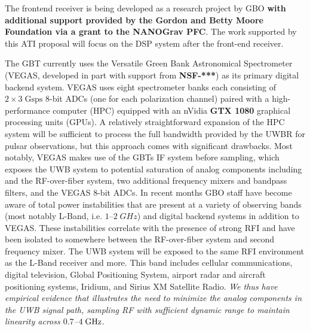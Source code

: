 \documentclass[10pt]{NSF}
\begin{document}
The frontend receiver is being developed as a research project by GBO
\textbf{with additional support provided by the Gordon and Betty Moore
  Foundation via a grant to the NANOGrav PFC}.  The work supported by
this ATI proposal will focus on the DSP system after the front-end
receiver.

 The GBT currently uses the Versatile
Green Bank Astronomical Spectrometer (VEGAS, developed in part with
support from \textbf{NSF-***}) as its primary digital backend system.
VEGAS uses eight spectrometer banks each consisting of $2 \times 3\;
\mathrm{Gsps}$ 8-bit ADCs (one for each polarization channel) paired
with a high-performance computer (HPC) equipped with an nVidia
\textbf{GTX 1080} graphical processing units (GPUs).  A relatively
straightforward expansion of the HPC system will be sufficient to
process the full bandwidth provided by the UWBR for pulsar
observations, but this approach comes with significant drawbacks.
Most notably, VEGAS makes use of the GBTs IF system before sampling,
which exposes the UWB system to potential saturation of analog
components including and the RF-over-fiber system, two additional
frequency mixers and bandpass filters, and the VEGAS 8-bit ADCs.  In
recent months GBO staff have become aware of total power instabilities
that are present at a variety of observing bands (most notably L-Band,
i.e. $1$--$2\; GHz$) and digital backend systems in addition to VEGAS.
These instabilities correlate with the presence of strong RFI and have
been isolated to somewhere between the RF-over-fiber system and second
frequency mixer.  The UWB system will be exposed to the same RFI
environment as the L-Band receiver and more.  This band includes
cellular communications, digital television, Global Positioning
System, airport radar and aircraft positioning systems, Iridium, and
Sirius XM Satellite Radio.  \emph{We thus have empirical evidence that
  illustrates the need to minimize the analog components in the UWB
  signal path, sampling RF with sufficient dynamic range to maintain
  linearity across $0.7$--$4\; \textrm{GHz}$}.

\end{document}
